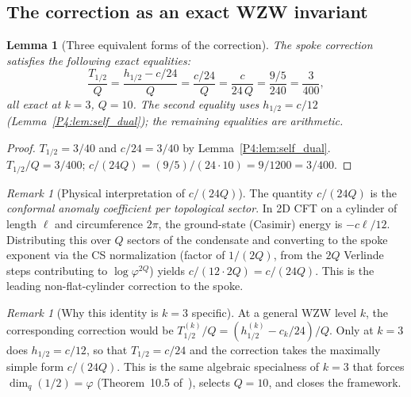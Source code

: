 \documentclass[11pt,a4paper]{article}
\newtheorem{lemma}[theorem]{Lemma}
\theoremstyle{definition}
\theoremstyle{remark}
\newtheorem{remark}[theorem]{Remark}
\newcommand{\vp}{\varphi}
\begin{document}
\subsection{The correction as an exact WZW invariant}
\label{P4:sec:exact_invariant}

\begin{lemma}[Three equivalent forms of the correction]
\label{P4:lem:three_forms}
The spoke correction satisfies the following exact equalities:
\begin{equation}
  \frac{T_{1/2}}{Q}
  = \frac{h_{1/2}-c/24}{Q}
  = \frac{c/24}{Q}
  = \frac{c}{24\,Q}
  = \frac{9/5}{240}
  = \frac{3}{400},
  \label{P4:eq:three_forms}
\end{equation}
all exact at $k=3$, $Q=10$.  The second equality uses $h_{1/2}=c/12$
(Lemma~\ref{P4:lem:self_dual}); the remaining equalities are arithmetic.
\end{lemma}

\begin{proof}
$T_{1/2}=3/40$ and $c/24=3/40$ by Lemma~\ref{P4:lem:self_dual}.
$T_{1/2}/Q=3/400$; $c/(24Q)=(9/5)/(24\cdot10)=9/1200=3/400$.
\end{proof}

\begin{remark}[Physical interpretation of $c/(24Q)$]
\label{P4:rem:c24Q_interpretation}
The quantity $c/(24Q)$ is the \emph{conformal anomaly coefficient per
topological sector}.  In 2D CFT on a cylinder of length $\ell$ and
circumference $2\pi$, the ground-state (Casimir) energy is $-c\ell/12$.
Distributing this over $Q$ sectors of the condensate and converting to
the spoke exponent via the CS normalization (factor of $1/(2Q)$, from
the $2Q$ Verlinde steps contributing to $\log\vp^{2Q}$) yields
$c/(12\cdot 2Q) = c/(24Q)$.  This is the leading non-flat-cylinder
correction to the spoke.
\end{remark}

\begin{remark}[Why this identity is $k=3$ specific]
\label{P4:rem:k3_specific}
At a general WZW level $k$, the corresponding correction would be
$T_{1/2}^{(k)}/Q = (h_{1/2}^{(k)}-c_k/24)/Q$.
Only at $k=3$ does $h_{1/2}=c/12$, so that $T_{1/2}=c/24$ and the
correction takes the maximally simple form $c/(24Q)$.
This is the same algebraic specialness of $k=3$ that forces $\dim_q(1/2)=\vp$
(Theorem~10.5 of~\cite{Paper3}), selects $Q=10$, and closes the framework.
\end{remark}
\end{document}
